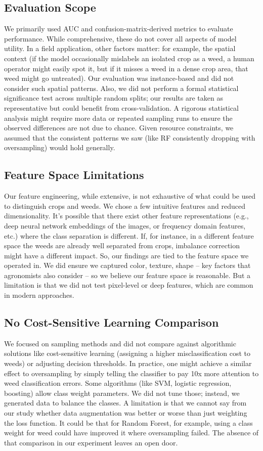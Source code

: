 \documentclass[letterpaper]{report}
\begin{document}
\subsection{Evaluation Scope}
We primarily used AUC and confusion-matrix-derived metrics to evaluate performance. While comprehensive, these do not cover all aspects of model utility. In a field application, other factors matter: for example, the spatial context (if the model occasionally mislabels an isolated crop as a weed, a human operator might easily spot it, but if it misses a weed in a dense crop area, that weed might go untreated). Our evaluation was instance-based and did not consider such spatial patterns. Also, we did not perform a formal statistical significance test across multiple random splits; our results are taken as representative but could benefit from cross-validation. A rigorous statistical analysis might require more data or repeated sampling runs to ensure the observed differences are not due to chance. Given resource constraints, we assumed that the consistent patterns we saw (like RF consistently dropping with oversampling) would hold generally.

\subsection{Feature Space Limitations}
Our feature engineering, while extensive, is not exhaustive of what could be used to distinguish crops and weeds. We chose a few intuitive features and reduced dimensionality. It’s possible that there exist other feature representations (e.g., deep neural network embeddings of the images, or frequency domain features, etc.) where the class separation is different. If, for instance, in a different feature space the weeds are already well separated from crops, imbalance correction might have a different impact. So, our findings are tied to the feature space we operated in. We did ensure we captured color, texture, shape – key factors that agronomists also consider – so we believe our feature space is reasonable. But a limitation is that we did not test pixel-level or deep features, which are common in modern approaches.

\subsection{No Cost-Sensitive Learning Comparison}
We focused on sampling methods and did not compare against algorithmic solutions like cost-sensitive learning (assigning a higher misclassification cost to weeds) or adjusting decision thresholds. In practice, one might achieve a similar effect to oversampling by simply telling the classifier to pay 10x more attention to weed classification errors. Some algorithms (like SVM, logistic regression, boosting) allow class weight parameters. We did not tune those; instead, we generated data to balance the classes. A limitation is that we cannot say from our study whether data augmentation was better or worse than just weighting the loss function. It could be that for Random Forest, for example, using a class weight for weed could have improved it where oversampling failed. The absence of that comparison in our experiment leaves an open door.
\end{document}
